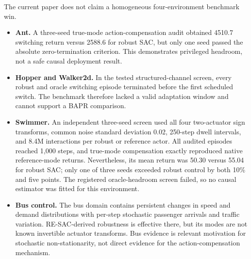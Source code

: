 The current paper does not claim a homogeneous four-environment benchmark win.
\begin{itemize}[leftmargin=*]
    \item \textbf{Ant.} A three-seed true-mode action-compensation audit obtained 4510.7 switching return versus 2588.6 for robust SAC, but only one seed passed the absolute zero-termination criterion. This demonstrates privileged headroom, not a safe causal deployment result.
    \item \textbf{Hopper and Walker2d.} In the tested structured-channel screen, every robust and oracle switching episode terminated before the first scheduled switch. The benchmark therefore lacked a valid adaptation window and cannot support a BAPR comparison.
    \item \textbf{Swimmer.} An independent three-seed screen used all four two-actuator sign transforms, common noise standard deviation 0.02, 250-step dwell intervals, and 8.4M interactions per robust or reference actor. All audited episodes reached 1,000 steps, and true-mode compensation exactly reproduced native reference-mode returns. Nevertheless, its mean return was 50.30 versus 55.04 for robust SAC; only one of three seeds exceeded robust control by both 10\% and five points. The registered oracle-headroom screen failed, so no causal estimator was fitted for this environment.
    \item \textbf{Bus control.} The bus domain contains persistent changes in speed and demand distributions with per-step stochastic passenger arrivals and traffic variation. RE-SAC-derived robustness is effective there, but its modes are not known invertible actuator transforms. Bus evidence is relevant motivation for stochastic non-stationarity, not direct evidence for the action-compensation mechanism.
\end{itemize}
